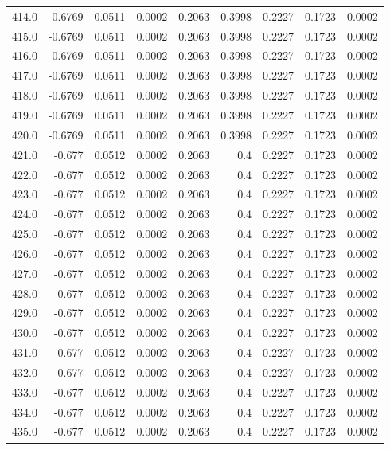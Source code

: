 \begin{longtable}{lrrrrrrrr}
414.0 & -0.6769 & 0.0511 & 0.0002 & 0.2063 & 0.3998 & 0.2227 & 0.1723 & 0.0002 \\
415.0 & -0.6769 & 0.0511 & 0.0002 & 0.2063 & 0.3998 & 0.2227 & 0.1723 & 0.0002 \\
416.0 & -0.6769 & 0.0511 & 0.0002 & 0.2063 & 0.3998 & 0.2227 & 0.1723 & 0.0002 \\
417.0 & -0.6769 & 0.0511 & 0.0002 & 0.2063 & 0.3998 & 0.2227 & 0.1723 & 0.0002 \\
418.0 & -0.6769 & 0.0511 & 0.0002 & 0.2063 & 0.3998 & 0.2227 & 0.1723 & 0.0002 \\
419.0 & -0.6769 & 0.0511 & 0.0002 & 0.2063 & 0.3998 & 0.2227 & 0.1723 & 0.0002 \\
420.0 & -0.6769 & 0.0511 & 0.0002 & 0.2063 & 0.3998 & 0.2227 & 0.1723 & 0.0002 \\
421.0 & -0.677 & 0.0512 & 0.0002 & 0.2063 & 0.4 & 0.2227 & 0.1723 & 0.0002 \\
422.0 & -0.677 & 0.0512 & 0.0002 & 0.2063 & 0.4 & 0.2227 & 0.1723 & 0.0002 \\
423.0 & -0.677 & 0.0512 & 0.0002 & 0.2063 & 0.4 & 0.2227 & 0.1723 & 0.0002 \\
424.0 & -0.677 & 0.0512 & 0.0002 & 0.2063 & 0.4 & 0.2227 & 0.1723 & 0.0002 \\
425.0 & -0.677 & 0.0512 & 0.0002 & 0.2063 & 0.4 & 0.2227 & 0.1723 & 0.0002 \\
426.0 & -0.677 & 0.0512 & 0.0002 & 0.2063 & 0.4 & 0.2227 & 0.1723 & 0.0002 \\
427.0 & -0.677 & 0.0512 & 0.0002 & 0.2063 & 0.4 & 0.2227 & 0.1723 & 0.0002 \\
428.0 & -0.677 & 0.0512 & 0.0002 & 0.2063 & 0.4 & 0.2227 & 0.1723 & 0.0002 \\
429.0 & -0.677 & 0.0512 & 0.0002 & 0.2063 & 0.4 & 0.2227 & 0.1723 & 0.0002 \\
430.0 & -0.677 & 0.0512 & 0.0002 & 0.2063 & 0.4 & 0.2227 & 0.1723 & 0.0002 \\
431.0 & -0.677 & 0.0512 & 0.0002 & 0.2063 & 0.4 & 0.2227 & 0.1723 & 0.0002 \\
432.0 & -0.677 & 0.0512 & 0.0002 & 0.2063 & 0.4 & 0.2227 & 0.1723 & 0.0002 \\
433.0 & -0.677 & 0.0512 & 0.0002 & 0.2063 & 0.4 & 0.2227 & 0.1723 & 0.0002 \\
434.0 & -0.677 & 0.0512 & 0.0002 & 0.2063 & 0.4 & 0.2227 & 0.1723 & 0.0002 \\
435.0 & -0.677 & 0.0512 & 0.0002 & 0.2063 & 0.4 & 0.2227 & 0.1723 & 0.0002 \\

\end{longtable}
